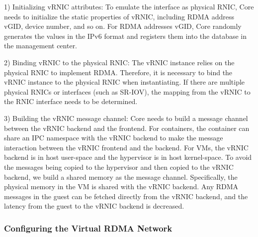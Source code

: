 
1) Initializing vRNIC attributes: To emulate the interface as physical RNIC, \sys Core needs to initialize the static properties of vRNIC, including RDMA address vGID, device number, and so on. For RDMA addresses vGID, \sys Core randomly generates the values in the IPv6 format and registers them into the database in the management center.


2) Binding vRNIC to the physical RNIC: The vRNIC instance relies on the physical RNIC to implement RDMA. Therefore, it is necessary to bind the vRNIC instance to the physical RNIC when instantiating. If there are multiple physical RNICs or interfaces (such as SR-IOV), the mapping from the vRNIC to the RNIC interface needs to be determined.


3) Building the vRNIC message channel: \sys Core needs to build a message channel between the vRNIC backend and the frontend. For containers, the container can share an IPC namespace with the vRNIC backend to make the message interaction between the vRNIC frontend and the backend. For VMs, the vRNIC backend is in host user-space and the hypervisor is in host kernel-space. To avoid the messages being copied to the hypervisor and then copied to the vRNIC backend, we build a shared memory as the message channel. Specifically, the physical memory in the VM is shared with the vRNIC backend. Any RDMA messages in the guest can be fetched directly from the vRNIC backend, and the latency from the guest to the vRNIC backend is decreased.

\subsubsection{\textbf{Configuring the Virtual RDMA Network}}
\
\noindent


